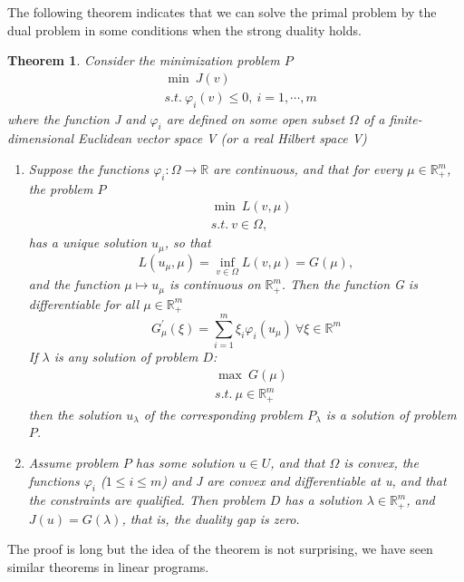 \documentclass[a4paper]{report}
\newtheorem{theorem}{Theorem}[section]
\begin{document}
The following theorem indicates that we can solve the primal problem by the dual problem in some conditions when the strong duality holds.

\begin{theorem}
    Consider the minimization problem $P$
    \begin{align*}
        &\min \ J(v)\\
        &s.t.\ \varphi_i(v)\leq 0, \ i=1,\cdots,m
    \end{align*}
    where the function J and $\varphi_i$ are defined on some open subset $\Omega$ of a finite-dimensional Euclidean vector space V (or a real Hilbert space V)
    \begin{enumerate}[label={(\arabic*)}]
        \item Suppose the functions $\varphi_i:\Omega\to \mathbb R$ are continuous, and that for every $\mu\in\mathbb R_+^m$, the problem $P$
            \begin{align*}
                &\min\ L(v,\mu)\\
                &s.t.\ v\in\Omega,
            \end{align*}
            has a unique solution $u_\mu$, so that
            \[
                L(u_\mu,\mu)=\inf_{v\in\Omega}L(v,\mu)=G(\mu),
            \]
            and the function $\mu\mapsto u_\mu$ is continuous on $\mathbb R_+^m$. Then the function G is differentiable for all $\mu\in\mathbb R_+^m$
            \[
                G^\prime_\mu(\xi)=\sum_{i=1}^m\xi_i\varphi_i(u_\mu) \ \forall \xi\in\mathbb R^m
            \]
            If $\lambda$ is any solution of problem $D$:
            \begin{align*}
                &\max\ G(\mu)\\
                &s.t.\ \mu\in\mathbb R_+^m
            \end{align*}
            then the solution $u_\lambda$ of the corresponding problem $P_\lambda$ is a solution of problem $P$.
        \item Assume problem $P$ has some solution $u\in U$, and that $\Omega$ is convex, the functions $\varphi_i$ ($1\leq i\leq m$) and J are convex and differentiable at u, and that the constraints are qualified. Then problem $D$ has a solution $\lambda\in\mathbb R_+^m$, and $J(u)=G(\lambda)$, that is, the duality gap is zero.
    \end{enumerate}
\end{theorem}

The proof is long but the idea of the theorem is not surprising, we have seen similar theorems in linear programs.
\end{document}
